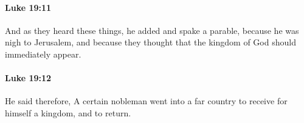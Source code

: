 		\paragraph{Luke 19:11} %
			\label{LUKE-19-11}

			And as they heard these things, he added and spake a parable, because he was nigh to Jerusalem, and because they thought that the kingdom of God should immediately appear.

			\begin{framed}
			\scriptsize
				\begin{compactdesc}
					\item[SBLG] 
				\end{compactdesc}
			\end{framed}

		\paragraph{Luke 19:12} %
			\label{LUKE-19-12}

			He said therefore, A certain nobleman went into a far country to receive for himself a kingdom, and to return.

